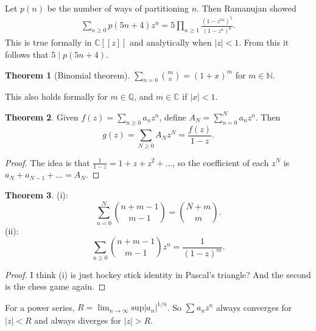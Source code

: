 \documentclass{article}
\theoremstyle{definition}
\newtheorem{theorem}{Theorem}[section]
\begin{document}

Let $p(n)$ be the number of ways of partitioning $n$. Then Ramanujan showed
\begin{align*}
    \sum_{n\ge 0}^{} p(5n+4)z^n = 5 \prod_{n\ge 1}^{} \frac{(1-z^{5n})^5}{(1-z^n)^6}.
\end{align*}
This is true formally in $\mathbb{C}[[z]]$ and analytically when $|z|<1$. From this it follows that $5 \mid p(5n+4)$.

\begin{theorem}[Binomial theorem]
    $\sum_{n=0}^{} {{m} \choose {n}} = (1+x)^m$ for $m \in \mathbb{N}$.
\end{theorem}
This also holds formally for $m \in \mathbb{Q}$, and $m \in \mathbb{C}$ if $|x|<1$.
\vspace{1mm}
\begin{theorem}
    Given $f(z)=\sum_{n\ge 0}^{} a_n z^n$, define $A_N = \sum_{n=0}^{N} a_n z^n$. Then $$g(z) = \sum_{N\ge 0}^{} A_N z^N = \frac{f(z)}{1-z}.$$
\end{theorem}
\begin{proof}
    The idea is that $\frac{1}{1-z}=1+z+z^2+\ldots$, so the coefficient of each $z^N$ is $a_N + a_{N-1} + \ldots = A_N$.
\end{proof}
\begin{theorem}
    (i): \[
        \sum_{n=0}^{N} {{n+m-1} \choose {m-1}} = {{N+m} \choose {m}}.
        \]
    (ii): \[
    \sum_{n\ge 0}^{} {{n+m-1} \choose {m-1}} z^n = \frac{1}{(1-z)^m}.
    \]
\end{theorem}
\begin{proof}
    I think (i) is just hockey stick identity in Pascal's triangle? And the second is the chess game again.
\end{proof}
\vspace{1mm}

For a power series, $R =\lim_{n \to \infty} \text{sup} |a_n|^{1/n}$. So $\sum_{}^{} a_n z^n $ always converges for $|z|<R$ and always diverges for $|z|>R$.
\end{document}
